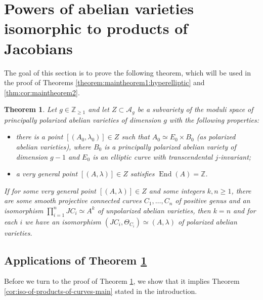\documentclass[a4paper,11pt,reqno]{amsart}
\numberwithin{equation}{section}
\newtheorem{theorem}{Theorem}[section]
\theoremstyle{plain}
\theoremstyle{definition}
\newcommand{\Z}{\mathbb Z}
\newcommand{\End}{\operatorname{End}}
\renewcommand{\cong}{\simeq}
\begin{document}
\section{Powers of abelian varieties isomorphic to products of Jacobians} \label{section:polarizations}

The goal of this section is to prove the following theorem, which will be used in the proof of Theorems \ref{theorem:maintheorem1:hyperelliptic} and \ref{thm:cor:maintheorem2}.

\begin{theorem}\label{cor:iso-of-products-of-curves-main-main}
Let $g\in \Z_{\geq 1}$ and let $Z\subset \mathcal A_g$ be a subvariety of the moduli space of principally polarized abelian varieties of dimension $g$ with the following properties:
\begin{itemize}
    \item there is a point $[(A_0,\lambda_0)]\in Z$ such that $A_0\cong E_0\times B_0$ (as polarized abelian varieties), where $B_0$ is a principally polarized abelian variety of dimension $g-1$ and $E_0$ is an elliptic curve with transcendental $j$-invariant; 
    \item a very general point $[(A,\lambda)]\in Z$ satisfies $\End(A)=\Z$.  
\end{itemize} 
If for some very general point  $[(A,\lambda)]\in Z$ and some integers $k,n \geq 1$, there are some smooth projective connected curves $C_1,\dots ,C_n$ of positive genus and an isomorphism $\prod_{i = 1}^nJC_i \cong A^k$ of unpolarized abelian varieties, then $k = n$ and for each $i$ we have an isomorphism $(JC_i,\Theta_{C_i}) \cong (A,\lambda)$ of polarized abelian varieties.
\end{theorem}

\subsection{Applications of Theorem \ref{cor:iso-of-products-of-curves-main-main}} 
Before we turn to the proof of Theorem \ref{cor:iso-of-products-of-curves-main-main}, we show that it implies Theorem \ref{cor:iso-of-products-of-curves-main} stated in the introduction. 
\end{document}
